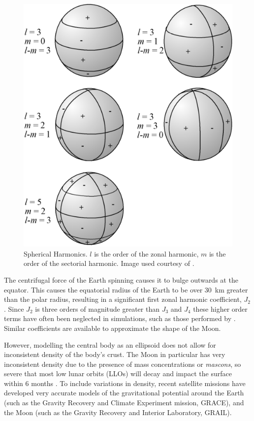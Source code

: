 \begin{figure}
\begin{center}
\includegraphics[scale=0.5]{Images/515px-Harmoniques_spheriques_positif_negatif.png}
\end{center}
\caption{Spherical Harmonics. $l$ is the order of the zonal harmonic, $m$ is the order of the sectorial harmonic. Image used courtesy of \cite{web_wiki_SphericalHarmonics}.}
\label{fig:Spherical-Harmonics}
\end{figure}

The centrifugal force of the Earth spinning causes it to bulge outwards at the equator. This causes the equatorial radius of the Earth to be over 30~km greater than the polar radius, resulting in a significant first zonal harmonic coefficient, $J_{2}$. Since $J_{2}$ is three orders of magnitude greater than $J_{3}$ and $J_{4}$ these higher order terms have often been neglected in simulations, such as those performed by \textcite{Yang2007}. Similar coefficients are available to approximate the shape of the Moon.

However, modelling the central body as an ellipsoid does not allow for inconsistent density of the body's crust. The Moon in particular has very inconsistent density due to the presence of mass concentrations or \emph{mascons}, so severe that most low lunar orbits (LLOs) will decay and impact the surface within 6 months \parencite{Zeile2010}. To include variations in density, recent satellite missions have developed very accurate models of the gravitational potential around the Earth (such as the Gravity Recovery and Climate Experiment mission, GRACE), and the Moon (such as the Gravity Recovery and Interior Laboratory, GRAIL).

